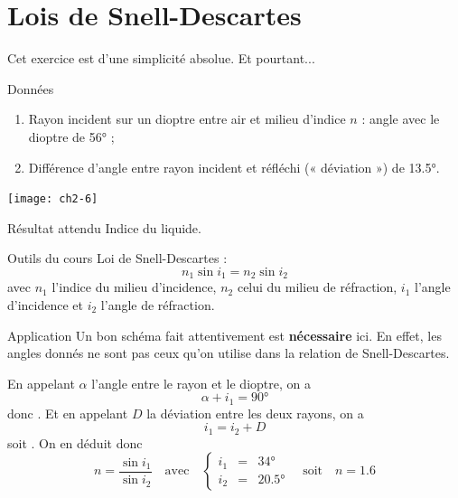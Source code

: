 \documentclass[../main/main.tex]{subfiles}
\begin{document}
\newpage

\section{Lois de Snell-Descartes}
Cet exercice est d'une simplicité absolue. Et pourtant...
\begin{tcbraster}[raster columns=5, raster equal height=rows]
    \begin{NCdefi}[raster multicolumn=3, sidebyside, righthand width=4cm]{Données}
        \begin{enumerate}
            \item Rayon incident sur un dioptre entre air et milieu d'indice $n$ :
                angle {\huge avec le dioptre} de \ang{56;;} ;
            \item Différence d'angle entre rayon incident et réfléchi (« déviation
                ») de \ang{13.5;;}.
        \end{enumerate}
        \tcblower
        \begin{center}
            \texttt{[image: ch2-6]}
        \end{center}
    \end{NCdefi}    
    \begin{tcolorbox}[blankest, raster multicolumn=2, space to=\myspace]
        \begin{tcbraster}[raster columns=1]
            \begin{NCprop}[add to natural height=\myspace]{Résultat attendu}
                Indice du liquide.
            \end{NCprop}
            \begin{NCdemo}{Outils du cours}
                Loi de Snell-Descartes :
                \[ n_1\sin i_1 = n_2 \sin i_2 \]
                avec $n_1$ l'indice du milieu d'incidence, $n_2$ celui du milieu
                de réfraction, $i_1$ l'angle d'incidence et $i_2$ l'angle de
                réfraction.
            \end{NCdemo}
        \end{tcbraster}
    \end{tcolorbox}
\end{tcbraster}

\begin{NCexem}{Application}
    Un bon schéma fait attentivement est \textbf{nécessaire} ici. En effet,
    les angles donnés ne sont pas ceux qu'on utilise dans la relation de
    Snell-Descartes. \bigbreak
    
    En appelant $\alpha$ l'angle entre le rayon et le dioptre, on a
    \[ \alpha + i_1 = \ang{90;;}\]
    donc . Et en appelant $D$ la déviation entre
    les deux rayons, on a
    \[ i_1 = i_2 + D\]
    soit . On en déduit donc
    \[\boxed{n = \frac{\sin i_1}{\sin i_2}} \quad \text{avec} \quad
        \left\{
            \begin{array}{rcl}
                i_1 & = & \ang{34;;}\\
                i_2 & = & \ang{20.5;;}
            \end{array}
    \right. \quad \text{soit} \quad \boxed{n = 1.6}
    \]
\end{NCexem}
\end{document}
